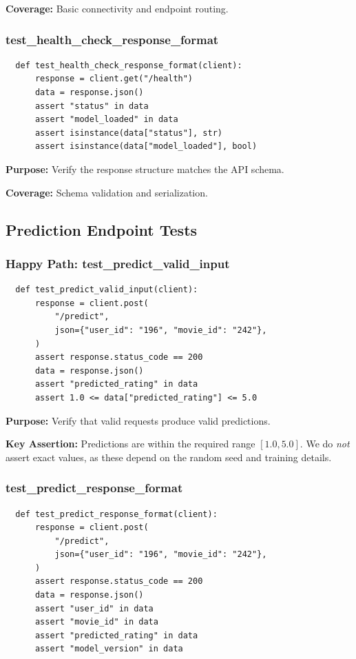 \textbf{Coverage:} Basic connectivity and endpoint routing.

\subsubsection{test\_health\_check\_response\_format}

\begin{verbatim}
  def test_health_check_response_format(client):
      response = client.get("/health")
      data = response.json()
      assert "status" in data
      assert "model_loaded" in data
      assert isinstance(data["status"], str)
      assert isinstance(data["model_loaded"], bool)
\end{verbatim}

\textbf{Purpose:} Verify the response structure matches the API schema.

\textbf{Coverage:} Schema validation and serialization.

\subsection{Prediction Endpoint Tests}

\subsubsection{Happy Path: test\_predict\_valid\_input}

\begin{verbatim}
  def test_predict_valid_input(client):
      response = client.post(
          "/predict",
          json={"user_id": "196", "movie_id": "242"},
      )
      assert response.status_code == 200
      data = response.json()
      assert "predicted_rating" in data
      assert 1.0 <= data["predicted_rating"] <= 5.0
\end{verbatim}

\textbf{Purpose:} Verify that valid requests produce valid predictions.

\textbf{Key Assertion:} Predictions are within the required range $[1.0, 5.0]$. We do \textit{not} assert 
exact values, as these depend on the random seed and training details.

\subsubsection{test\_predict\_response\_format}

\begin{verbatim}
  def test_predict_response_format(client):
      response = client.post(
          "/predict",
          json={"user_id": "196", "movie_id": "242"},
      )
      assert response.status_code == 200
      data = response.json()
      assert "user_id" in data
      assert "movie_id" in data
      assert "predicted_rating" in data
      assert "model_version" in data
\end{verbatim}

